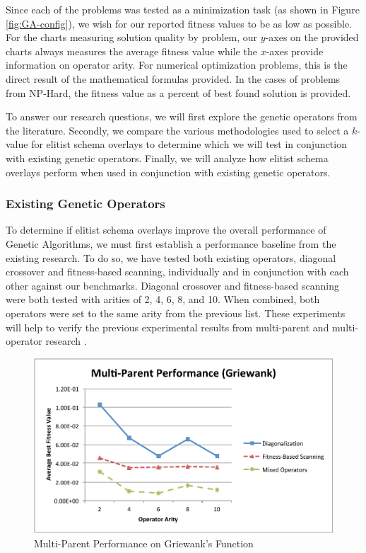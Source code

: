 Since each of the problems was tested as a minimization task (as shown in Figure \ref{fig:GA-config}), we wish for our reported fitness values to be as low as possible. For the charts measuring solution quality by problem, our $y$-axes on the provided charts always measures the average fitness value while the $x$-axes provide information on operator arity. For numerical optimization problems, this is the direct result of the mathematical formulas provided. In the cases of problems from NP-Hard, the fitness value as a percent of best found solution is provided.

To answer our research questions, we will first explore the genetic operators from the literature. Secondly, we compare the various methodologies used to select a $k$-value for elitist schema overlays to determine which we will test in conjunction with existing genetic operators. Finally, we will analyze how elitist schema overlays perform when used in conjunction with existing genetic operators.

\subsubsection*{Existing Genetic Operators}
To determine if elitist schema overlays improve the overall performance of Genetic Algorithms, we must first establish a performance baseline from the existing research. To do so, we have tested both existing operators, diagonal crossover and fitness-based scanning, individually and in conjunction with each other against our benchmarks. Diagonal crossover and fitness-based scanning were both tested with arities of 2, 4, 6, 8, and 10. When combined, both operators were set to the same arity from the previous list. These experiments will help to verify the previous experimental results from multi-parent and multi-operator research \cite{Smith04, Eiben95}.

\begin{figure}[htbp!]
\centering
\includegraphics[scale=0.70]{charts/MP_Griewank.pdf}
\caption{Multi-Parent Performance on Griewank's Function}
\label{fig:mp_griewank}
\end{figure}

